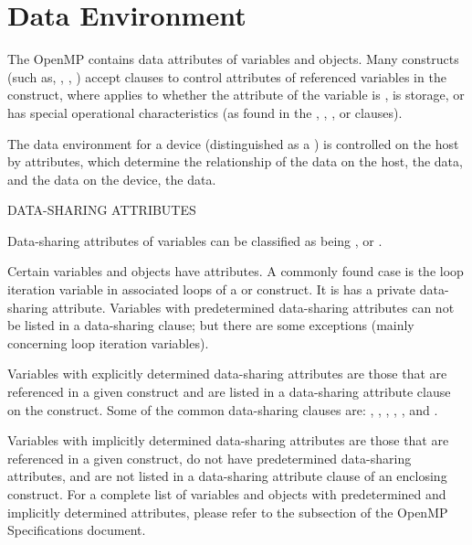 \pagebreak
\chapter{Data Environment}
\label{chap:data_environment}
The OpenMP  contains data attributes of variables and
objects.  Many constructs (such as, , , ) 
accept clauses to control  attributes
of referenced variables in the construct, where  applies to
whether the attribute of the variable is , 
is  storage, or has special operational characteristics 
(as found in the , , , or  clauses).

The data environment for a device (distinguished as a )
is controlled on the host by  attributes, which determine the
relationship of the data on the host, the  data, and the data on the
device, the  data.
\newline

DATA-SHARING ATTRIBUTES

Data-sharing attributes of variables can be classified as being ,
 or .

Certain variables and objects have  attributes.  
A commonly found case is the loop iteration variable in associated loops 
of a  or  construct. It is has a private data-sharing attribute.
Variables with predetermined data-sharing attributes can not be listed in a data-sharing clause; but there are some
exceptions (mainly concerning loop iteration variables).

Variables with explicitly determined data-sharing attributes are those that are
referenced in a given construct and are listed in a data-sharing attribute
clause on the construct. Some of the common data-sharing clauses are:
, , , , 
, and . %

Variables with implicitly determined data-sharing attributes are those
that are referenced in a given construct, do not have predetermined
data-sharing attributes, and are not listed in a data-sharing
attribute clause of an enclosing construct.
For a complete list of variables and objects with predetermined and
implicitly determined attributes, please refer to the
subsection of the OpenMP Specifications document.  
\newline


